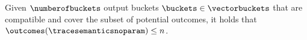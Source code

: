 Given $\numberofbuckets$ output buckets $\buckets\in\vectorbuckets$ that are compatible and cover the subset of potential outcomes, it holds that
  $\outcomes(\tracesemanticsnoparam) \le n$.
